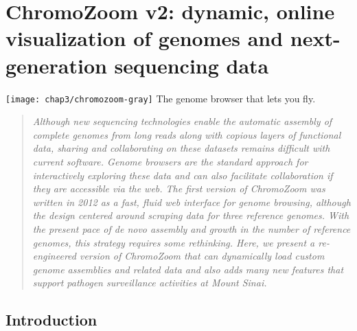 
\chapter{ChromoZoom v2: dynamic, online visualization of genomes and next-generation sequencing data}

\begin{marginfigure}[1cm]
  \texttt{[image: chap3/chromozoom-gray]}
  The genome browser that lets you fly.
\end{marginfigure}

\begin{quote}
\emph{Although new sequencing technologies enable the automatic assembly of complete genomes from long reads along with copious layers of functional data, sharing and collaborating on these datasets remains difficult with current software. Genome browsers are the standard approach for interactively exploring these data and can also facilitate collaboration if they are accessible via the web. The first version of ChromoZoom was written in 2012 as a fast, fluid web interface for genome browsing, although the design centered around scraping data for three reference genomes. With the present pace of \emph{de novo} assembly and growth in the number of reference genomes, this strategy requires some rethinking. Here, we present a re-engineered version of ChromoZoom that can dynamically load custom genome assemblies and related data and also adds many new features that support pathogen surveillance activities at Mount Sinai.}
\end{quote}

\section{Introduction}

